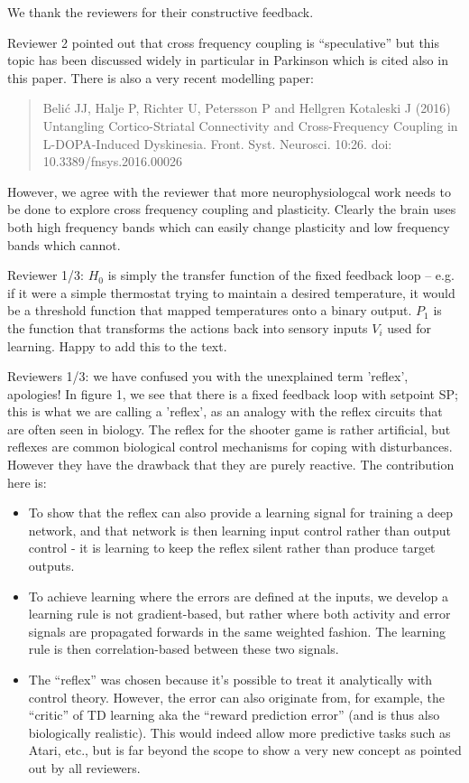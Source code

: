 \documentclass{article}
\begin{document}
We thank the reviewers for their constructive feedback.

Reviewer 2 pointed out that cross frequency coupling is ``speculative''
but this topic has been discussed widely in particular in Parkinson which
is cited also in this paper. There is also a very recent modelling paper:
\begin{quote}
  Belić JJ, Halje P, Richter U, Petersson P and Hellgren Kotaleski J (2016) Untangling Cortico-Striatal Connectivity and Cross-Frequency Coupling in L-DOPA-Induced Dyskinesia. Front. Syst. Neurosci. 10:26. doi: 10.3389/fnsys.2016.00026
\end{quote}
However, we agree with the reviewer that more neurophysiologcal work needs
to be done to explore cross frequency coupling and plasticity. Clearly
the brain uses both high frequency bands which can easily change plasticity
and low frequency bands which cannot.

Reviewer 1/3: $H_{0}$ is simply the transfer function of the fixed feedback
loop – e.g. if it were a simple thermostat trying to maintain a
desired temperature, it would be a threshold function that mapped
temperatures onto a binary output. $P_{1}$ is the function that
transforms the actions back into sensory inputs $V_{i}$ used for
learning. Happy to add this to the text.
	
Reviewers 1/3: we have confused you with the unexplained term 'reflex', apologies!
In figure 1, we see that there is a fixed feedback loop with setpoint
SP; this is what we are calling a 'reflex', as an analogy with the
reflex circuits that are often seen in biology. The reflex for the
shooter game is rather artificial, but reflexes are common biological
control mechanisms for coping with disturbances. However they have the
drawback that they are purely reactive. The contribution here is:
\begin{itemize}
\item To show that the reflex can also provide a learning signal for
  training a deep network, and that network is then learning input
  control rather than output control - it is learning to keep the
  reflex silent rather than produce target outputs.
\item To achieve learning where the errors are defined at the inputs,
  we develop a learning rule is not gradient-based, but rather where
  both activity and error signals are propagated forwards in the same
  weighted fashion. The learning rule is then correlation-based
  between these two signals.
\item The ``reflex'' was chosen because it's possible to treat it
  analytically with control theory. However, the error can also
  originate from, for example, the ``critic'' of TD learning aka the
  ``reward prediction error'' (and is thus also biologically
  realistic). This would indeed allow more predictive tasks such as
  Atari, etc., but is far beyond the scope to show a very new concept as
  pointed out by all reviewers.
\end{itemize}
		
\end{document}
